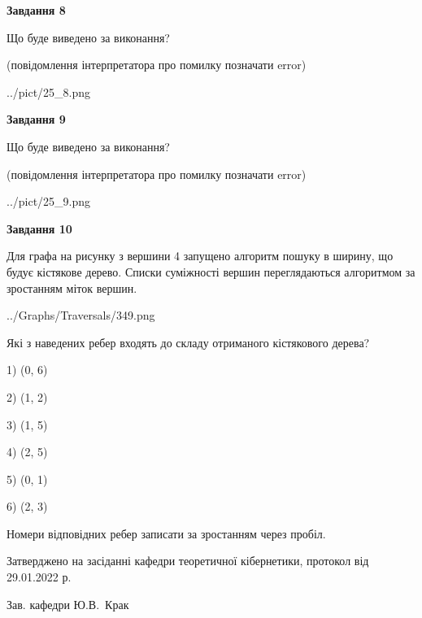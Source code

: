 \documentclass[12pt, ukrainian]{article}
\begin{document}
{\begin {large}
{\begin {center}\textbf{Завдання 8}\end {center}}\par
Що буде виведено за виконання?\par
 (повідомлення інтерпретатора про помилку позначати error)
\begin{center}
	{../pict/25_8.png}
\end{center}
\newpage

{\begin {center}\textbf{Завдання 9}\end {center}}\par
Що буде виведено за виконання?\par
 (повідомлення інтерпретатора про помилку позначати error)\par
\begin{center}
	{../pict/25_9.png}
\end{center}
\newpage

{\begin {center}\textbf{Завдання 10}\end {center}}\par
Для графа на рисунку з вершини 4 запущено алгоритм пошуку в ширину, що будує кістякове дерево. Списки суміжності вершин переглядаються алгоритмом за зростанням міток вершин.\par
\begin{center}
	{../Graphs/Traversals/349.png}
\end{center}
\par Які з наведених ребер входять до складу отриманого кістякового дерева?\par
1) (0, 6)\par
2) (1, 2)\par
3) (1, 5)\par
4) (2, 5)\par
5) (0, 1)\par
6) (2, 3)\par
{\vskip 15pt} Номери відповідних ребер записати за зростанням через пробіл.\par
\newpage


\end {large}
}
{\smallskip \begin {small} Затверджено на засіданні кафедри теоретичної кібернетики, протокол  від   29.01.2022 р.\par\smallskip\smallskip
{\parbox {6.5 cm}{Зав. кафедри \dotfill Ю.В.~Крак}} \end{small}}
\end{document}
